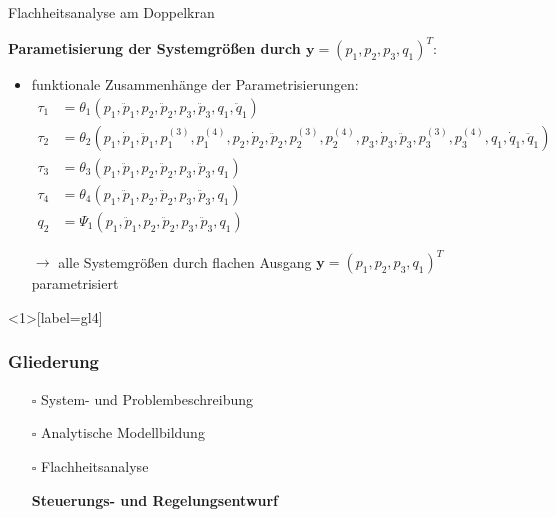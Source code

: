 \documentclass[
	ngerman,
	10pt,				%
	aspectratio=169 	%
]{beamer}
\newcommand{\cdbox}{$\square$\hspace{-0.65em}\raisebox{0.1em}{\checkmark}\hspace{-0.18em}}
\begin{document}

\begin{frame}[t,fragile,label=Flachheit_Doppelkran_2]{\large Flachheitsanalyse am Doppelkran}
	
	\textbf{Parametisierung der Systemgrößen durch $\mathbf{y} = (p_1, p_2, p_3, q_1)^T:$}
		
	\begin{itemize}
		\item funktionale Zusammenhänge der Parametrisierungen:
		\begin{align*}
			\tau_1 &= \theta_1 \left(p_1, \ddot{p}_1, p_2, \ddot{p}_2, p_3, \ddot{p}_3, q_1, \ddot{q}_1 \right) \\
			\tau_2 &= \theta_2 \left(p_1, \dot{p}_1, \ddot{p}_1, p_1^{(3)}, p_1^{(4)}, p_2, \dot{p}_2, \ddot{p}_2, p_2^{(3)}, p_2^{(4)}, p_3, \dot{p}_3, \ddot{p}_3, p_3^{(3)}, p_3^{(4)}, q_1, \dot{q}_1, \ddot{q}_1 \right) \\
			\tau_3 &= \theta_3 \left(p_1, \ddot{p}_1, p_2, \ddot{p}_2, p_3, \ddot{p}_3, q_1 \right) \\
			\tau_4 &= \theta_4 \left(p_1, \ddot{p}_1, p_2, \ddot{p}_2, p_3, \ddot{p}_3, q_1 \right) \\
			q_2 &= \Psi_1 \left(p_1, \ddot{p}_1, p_2, \ddot{p}_2, p_3, \ddot{p}_3, q_1 \right)
		\end{align*}
		\pause
		\item[$\rightarrow$] alle Systemgrößen durch flachen Ausgang $\mathbf{y} = (p_1, p_2, p_3, q_1)^T$ parametrisiert
	\end{itemize}
		
\end{frame}


\begin{frame}<1>[label=gl4]
	\frametitle{Gliederung}
	\begin{itemize}
		\item[\cdbox] System- und Problembeschreibung
		\item[\cdbox] Analytische Modellbildung
		\item[\cdbox] Flachheitsanalyse
		\item[\only<1>{$\rightarrow$}\only<2>{$\rightarrow$}\only<4->{\cdbox}]
		\textbf<1>{Steuerungs- und Regelungsentwurf}
	\end{itemize}
\end{frame}
\end{document}
